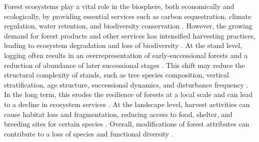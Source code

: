 
Forest ecosystems play a vital role in the biosphere, both economically and ecologically, by providing essential services such as carbon sequestration, climate regulation, water retention, and biodiversity conservation \citep{Balvanera2006Quantifyingevidence,Diaz2006BiodiversityLoss,Canadell2008Managingforests,Pawson2013Plantationforests}. 
However, the growing demand for forest products and other services has intensified harvesting practices, leading to ecosystem degradation and loss of biodiversity \citep{Bengtsson2000Biodiversitydisturbances,Sala2000Globalbiodiversity,Foley2005GlobalConsequences,Naeem2012functionsbiological}. 
At the stand level, logging often results in an overrepresentation of early-successional forests and a reduction of abundance of later successional stages \citep{Cyr2009Forestmanagement,Boucher2017Cumulativepatterns}. 
This shift may reduce the structural complexity of stands, such as tree species composition, vertical stratification, age structure, successional dynamics, and disturbance frequency \citep{Bergeron2000Speciesstand,Commarmot2005Structurevirgin,Varga2005Treesizediversity}. 
In the long term, this erodes the resilience of forests at a local scale and can lead to a decline in ecosystem services \citep{Hooper2012globalsynthesis,Edwards2014Maintainingecosystem}. 
At the landscape level, harvest activities can cause habitat loss and fragmentation, reducing access to food, shelter, and breeding sites for certain species \citep{Bouderbala2023Longtermeffect}. 
Overall, modifications of forest attributes can contribute to a loss of species and functional diversity \citep{Saccheri1998Inbreedingextinction}. 


